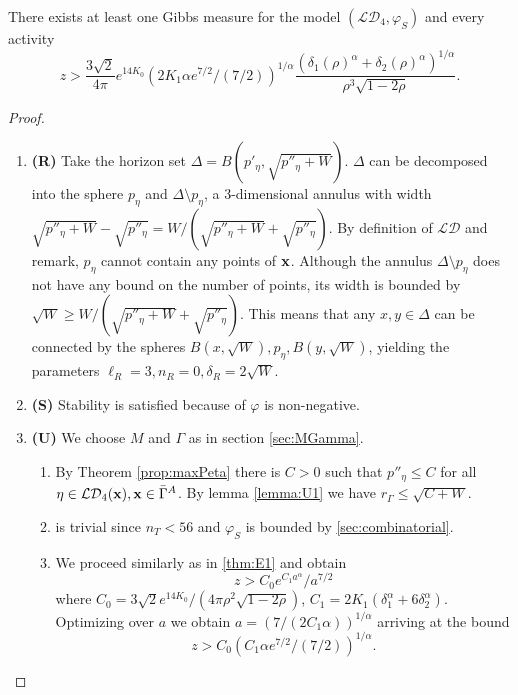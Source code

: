 \begin{theorem}\label{thm:E3}
	There exists at least one Gibbs measure for the model $(\mathcal {LD}_4,\varphi_S)$ and every activity 
	$$z> \frac{3\sqrt 2}{4\pi}e^{14 K_0}   (2K_1 \alpha e^{7/2}/(7/2))^{1/\alpha} \frac{(\delta_1(\rho)^\alpha + \delta_2(\rho)^\alpha)^{1/\alpha}}{\rho^3 \sqrt{1-2\rho}}.$$
\end{theorem}
\begin{proof}
\begin{enumerate}[]
	\item \textbf{(R)} Take the horizon set $\Delta = B(p'_\eta, \sqrt{p''_\eta + W})$. $\Delta$ can be decomposed into the sphere $p_\eta$ and $\Delta \setminus p_\eta$, a 3-dimensional annulus with width $\sqrt{p''_\eta+W} -\sqrt{p''_\eta}=W/(\sqrt{p''_\eta+W} + \sqrt{p''_\eta})$. By definition of $\mathcal {LD}$ and remark, $p_\eta$  cannot contain any points of ${\mathbf{x}}$.  Although the annulus $\Delta \setminus p_\eta$ does not have any bound on the number of points, its width is bounded by $\sqrt W \geq  W/(\sqrt{p''_\eta+W} + \sqrt{p''_\eta})$. This means that any $x,y\in \Delta$ can be connected by the spheres $B(x,\sqrt W), p_\eta, B(y,\sqrt W)$, yielding the parameters $\ell_R = 3,n_R=0,\delta_R=2\sqrt W$.
	\item \textbf{(S)} Stability is satisfied because of $\varphi$ is non-negative.
	\item \textbf{(U)} We choose $M$ and $\Gamma$ as in section \ref{sec:MGamma}.
		\begin{enumerate}[(U1)]
			\item By Theorem \ref{prop:maxPeta} there is $C>0$ such that $p''_\eta\leq C$ for all $\eta \in \mathcal {LD}_4({\mathbf{x}}), {\mathbf{x}} \in \bar\Gamma^A$. By lemma \ref{lemma:U1} we have $r_\Gamma\leq \sqrt{C + W}$.
			\item is trivial since $n_T<56$ and $\varphi_{S}$ is bounded by \ref{sec:combinatorial}.
			\item We proceed similarly as in \ref{thm:E1} and obtain
				$$z>C_0 e^{C_1 a^\alpha} / a^{7/2}$$
				where $C_0=3 \sqrt 2 e^{14K_0} / (4\pi \rho^2 \sqrt{1-2\rho})$, $C_1 = 2K_1(\delta_1^\alpha + 6\delta_2^\alpha)$. Optimizing over $a$ we obtain $a=(7/(2C_1\alpha))^{1/\alpha}$ arriving at the bound
				$$z> C_0 (C_1 \alpha e^{7/2} / (7/2))^{1/\alpha}.$$
		\end{enumerate}
\end{enumerate}
\end{proof}



